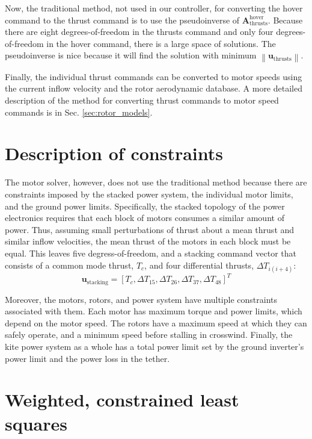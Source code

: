 \documentclass[11pt]{amsart}
\newcommand{\Athrustshover}{\mathbf{A}_{\mathrm{thrusts}}^{\mathrm{hover}}}
\newcommand{\norm}[1]{\left\lVert#1\right\rVert}
\begin{document}
Now, the traditional method, not used in our controller, for
converting the hover command to the thrust command is to use the
pseudoinverse of $\Athrustshover$.  Because there are eight
degrees-of-freedom in the thrusts command and only four
degrees-of-freedom in the hover command, there is a large space of
solutions.  The pseudoinverse is nice because it will find the
solution with minimum $\norm{\mathbf{u}_{\mathrm{thrusts}}}$.

Finally, the individual thrust commands can be converted to motor
speeds using the current inflow velocity and the rotor aerodynamic
database.  A more detailed description of the method for converting
thrust commands to motor speed commands is in
Sec. \ref{sec:rotor_models}.

\section{Description of constraints}

The motor solver, however, does not use the traditional method because
there are constraints imposed by the stacked power system, the
individual motor limits, and the ground power limits.  Specifically,
the stacked topology of the power electronics requires that each block
of motors consumes a similar amount of power.  Thus, assuming small
perturbations of thrust about a mean thrust and similar inflow
velocities, the mean thrust of the motors in each block must be equal.
This leaves five degress-of-freedom, and a stacking command vector
that consists of a common mode thrust, $T_c$, and four differential
thrusts, $\Delta T_{i(i+4)}$:
%
\begin{equation}
  \label{eqn:stacking_command}
  \mathbf{u_{\mathrm{stacking}}} = [T_c, \Delta T_{15}, \Delta T_{26},
                                    \Delta T_{37}, \Delta T_{48}]^T
\end{equation}

Moreover, the motors, rotors, and power system have multiple
constraints associated with them.  Each motor has maximum torque and
power limits, which depend on the motor speed.  The rotors have a
maximum speed at which they can safely operate, and a minimum speed
before stalling in crosswind.  Finally, the kite power system as a
whole has a total power limit set by the ground inverter's power limit
and the power loss in the tether.

\section {Weighted, constrained least squares}
\end{document}
